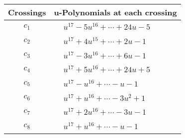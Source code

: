 \documentclass[1p]{elsarticle_modified}
\theoremstyle{definition}
\begin{document}
\begin{tabular}{m{50pt}|m{274pt}}
Crossings & \hspace{64pt}u-Polynomials at each crossing \\
\hline $$\begin{aligned}c_{1}\end{aligned}$$&$\begin{aligned}
&u^{17}-5 u^{16}+\cdots+24 u-5
\end{aligned}$\\
\hline $$\begin{aligned}c_{2}\end{aligned}$$&$\begin{aligned}
&u^{17}+4 u^{15}+\cdots+2 u-1
\end{aligned}$\\
\hline $$\begin{aligned}c_{3}\end{aligned}$$&$\begin{aligned}
&u^{17}-3 u^{16}+\cdots+6 u-1
\end{aligned}$\\
\hline $$\begin{aligned}c_{4}\end{aligned}$$&$\begin{aligned}
&u^{17}+5 u^{16}+\cdots+24 u+5
\end{aligned}$\\
\hline $$\begin{aligned}c_{5}\end{aligned}$$&$\begin{aligned}
&u^{17}- u^{16}+\cdots- u-1
\end{aligned}$\\
\hline $$\begin{aligned}c_{6}\end{aligned}$$&$\begin{aligned}
&u^{17}+u^{16}+\cdots-3 u^2+1
\end{aligned}$\\
\hline $$\begin{aligned}c_{7}\end{aligned}$$&$\begin{aligned}
&u^{17}+2 u^{16}+\cdots-3 u-1
\end{aligned}$\\
\hline $$\begin{aligned}c_{8}\end{aligned}$$&$\begin{aligned}
&u^{17}+u^{16}+\cdots- u-1
\end{aligned}$\\

\end{tabular}
\end{document}
